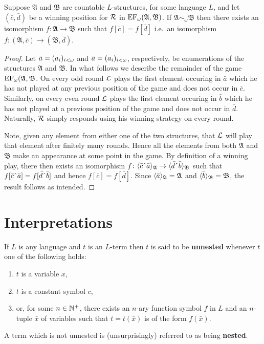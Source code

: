 \begin{prp}\label{prp:bfiso}
	Suppose $\mathfrak{A}$ and $\mathfrak{B}$ are countable $L$-structures, for some language $L$, and let $(\bar{c},\bar{d})$ be a winning position for $\mathcal{R}$ in $\operatorname{EF}_\omega(\mathfrak{A},\mathfrak{B})$.  If $\mathfrak{A}\sim_\omega\mathfrak{B}$ then there exists an isomorphism $f\colon\mathfrak{A}\to\mathfrak{B}$ such that $f[\bar{c}]=f[\bar{d}]$ i.e.\ an isomorphism $f\colon(\mathfrak{A},\bar{c})\to(\mathfrak{B},\bar{d})$.
\end{prp}
\begin{proof}
	Let $\bar{a}=(a_i)_{i<\omega}$ and $\bar{a}=(a_i)_{i<\omega}$, respectively, be enumerations of the structures $\mathfrak{A}$ and $\mathfrak{B}$.  In what follows we describe the remainder of the game $\operatorname{EF}_\omega(\mathfrak{A},\mathfrak{B}$.  On every odd round $\mathcal{L}$ plays the first element occuring in $\bar{a}$ which he has not played at any previous position of the game and does not occur in $\bar{c}$.  Similarly, on every even round $\mathcal{L}$ plays the first element occuring in $\bar{b}$ which he has not played at a previous position of the game and does not occur in $\bar{d}$.  Naturally, $\mathcal{R}$ simply responds using his winning strategy on every round.

	Note, given any element from either one of the two structures, that $\mathcal{L}$ will play that element after finitely many rounds.  Hence all the elements from both $\mathfrak{A}$ and $\mathfrak{B}$ make an appearance at some point in the game.  By definition of a winning play, there then exists an isomorphism $f\colon\gen{\bar{c}\string^\bar{a}}{\mathfrak{A}}\to\gen{\bar{d}\string^\bar{b}}{\mathfrak{B}}$ such that $f[\bar{c}\string^\bar{a}]=f[\bar{d}\string^\bar{b}]$ and hence $f[\bar{c}]=f[\bar{d}]$.  Since $\langle \bar{a}\rangle_{\mathfrak{A}}=\mathfrak{A}$ and $\langle \bar{b}\rangle_{\mathfrak{B}}=\mathfrak{B}$, the result follows as intended.
\end{proof}


\section{Interpretations}

\begin{dfn}
	If $L$ is any language and $t$ is an $L$-term then $t$ is said to be \textbf{unnested} whenever $t$ one of the following holds:
	\begin{enumerate}
		\item	$t$ is a variable $x$,
		\item	$t$ is a constant symbol $c$,
		\item	or, for some $n\in\mathbb{N}^{+}$, there exists an $n$-ary function symbol $f$ in $L$ and an $n$-tuple $\bar{x}$ of variables such that $t=t(\bar{x})$ is of the form $f(\bar{x})$.
	\end{enumerate}
	A term which is not unnested is (unsurprisingly) referred to as being \textbf{nested}.
\end{dfn}

